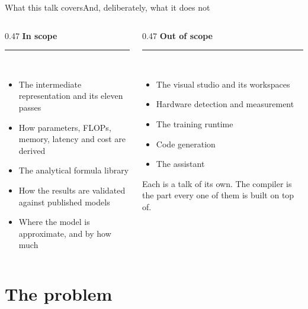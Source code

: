 \documentclass[aspectratio=169,11pt]{beamer}
\newcommand{\subtle}[1]{{\footnotesize\color{nxSlate}#1}}
\begin{document}
\begin{frame}{What this talk covers}{And, deliberately, what it does not}
  \vspace{0.2cm}
  \begin{columns}[T]
    \begin{column}{0.47\textwidth}
      {\color{nxMoss}\bfseries In scope}\\[6pt]
      \textcolor{nxRule}{\rule{\linewidth}{0.6pt}}\\[8pt]
      \begin{itemize}\setlength\itemsep{5pt}
        \item The intermediate representation and its eleven passes
        \item How parameters, FLOPs, memory, latency and cost are derived
        \item The analytical formula library
        \item How the results are validated against published models
        \item Where the model is approximate, and by how much
      \end{itemize}
    \end{column}
    \begin{column}{0.47\textwidth}
      {\color{nxMute}\bfseries Out of scope}\\[6pt]
      \textcolor{nxRule}{\rule{\linewidth}{0.6pt}}\\[8pt]
      \begin{itemize}\setlength\itemsep{5pt}
        \color{nxSlate}
        \item The visual studio and its workspaces
        \item Hardware detection and measurement
        \item The training runtime
        \item Code generation
        \item The assistant
      \end{itemize}
      \vspace{10pt}
      \subtle{Each is a talk of its own. The compiler is the part every one of
      them is built on top of.}
    \end{column}
  \end{columns}
\end{frame}

\section{The problem}
\end{document}
